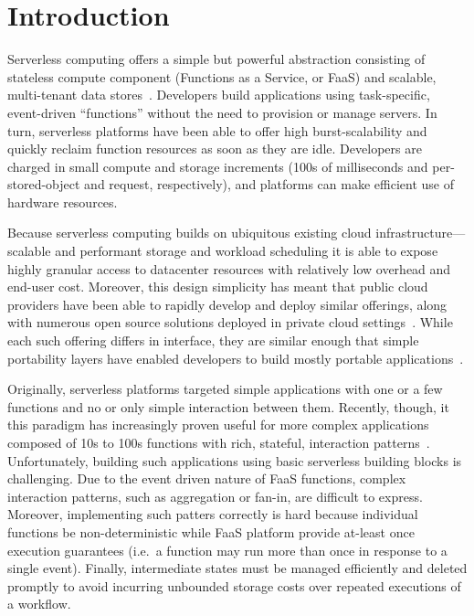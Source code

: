 \section{Introduction}

Serverless computing offers a simple but powerful abstraction consisting of
stateless compute component (Functions as a Service, or FaaS) and scalable,
multi-tenant data stores~\cite{berkeley}. Developers build applications using
task-specific, event-driven ``functions'' without the need to provision or
manage servers. In turn, serverless platforms have been able to offer high
burst-scalability and quickly reclaim function resources as soon as they are
idle. Developers are charged in small compute and storage increments (100s of
milliseconds and per-stored-object and request, respectively), and platforms
can make efficient use of hardware resources.

Because serverless computing builds on ubiquitous existing cloud
infrastructure---scalable and performant storage and workload scheduling it is
able to expose highly granular access to datacenter resources with relatively
low overhead and end-user cost. Moreover, this design simplicity has meant that
public cloud providers have been able to rapidly develop and deploy similar
offerings, along with numerous open source solutions deployed in private cloud
settings~\cite{aws-lambda,gcp-functions,azure-functions,openwhisk,openfaas}.
While each such offering differs in interface, they are similar enough that
simple portability layers have enabled developers to build mostly portable
applications~\cite{serverless-framework}.

Originally, serverless platforms targeted simple applications with one or a few
functions and no or only simple interaction between them. Recently, though, it
this paradigm has increasingly proven useful for more complex applications
composed of 10s to 100s functions with rich, stateful, interaction
patterns~\cite{excamera, pywren, gg-atc, beldi, boki}. Unfortunately, building
such applications using basic serverless building blocks is challenging.  Due to
the event driven nature of FaaS functions, complex interaction patterns, such as
aggregation or fan-in, are difficult to express. Moreover, implementing such
patters correctly is hard because individual functions be non-deterministic
while FaaS platform provide at-least once execution guarantees (i.e.\ a function
may run more than once in response to a single event). Finally, intermediate
states must be managed efficiently and deleted promptly to avoid incurring
unbounded storage costs over repeated executions of a workflow.

